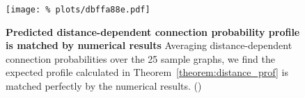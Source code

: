 \begin{figure}[H]
  \centering
  \texttt{[image: \%
    plots/dbffa88e.pdf]} 
  \captionsetup{skip=0pt}
  \caption{\textbf{Predicted distance-dependent connection probability
      profile is matched by numerical results} Averaging
    distance-dependent connection probabilities over the 25 sample
    graphs, we find the expected profile calculated in
    Theorem~\ref{theorem:distance_prof} is matched perfectly by the
    numerical results. () }
  \label{fig:distance_theory_compare}
\end{figure}






